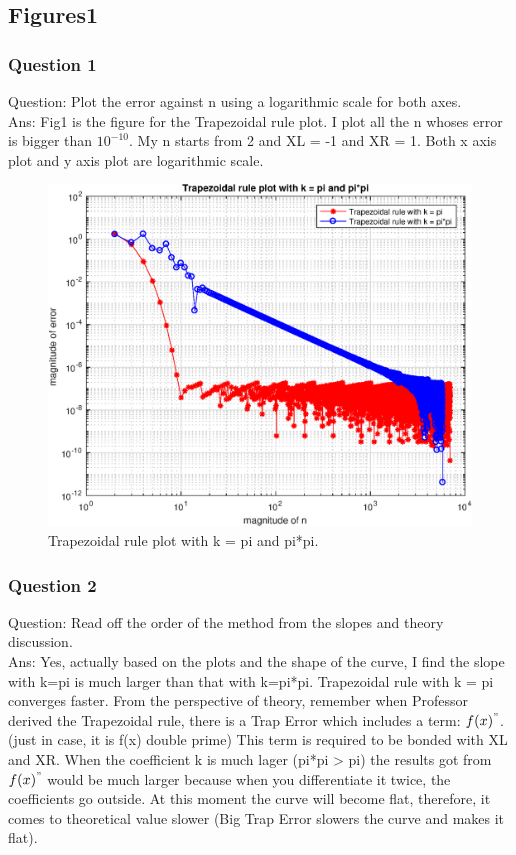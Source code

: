 \documentclass[titlepage]{article}
\begin{document}
\subsection{Figures1}
\subsubsection{Question 1} 
Question: Plot the error against n using a logarithmic scale for both axes.\\
Ans: Fig1 is the figure for the Trapezoidal rule plot. I plot all the n
whoses error is bigger than $10^{-10}$. My n starts from 2 and XL = -1
and XR = 1. Both x axis plot and y axis plot are logarithmic scale.

\begin{figure}[htb]
\begin{center}
\includegraphics[width=1.0\textwidth]{Trapezoidal.eps}
\caption{Trapezoidal rule plot with k = pi and pi*pi. \label{fig:1}}
\end{center}
\end{figure}

\subsubsection{Question 2}
Question: Read off the order of the method from the slopes and theory discussion.\\
Ans: Yes, actually based on the plots and the shape of the curve, I
find the slope with k=pi is much larger than that with
k=pi*pi. Trapezoidal rule with k = pi converges faster. From the
perspective of theory, remember when Professor derived the Trapezoidal
rule, there is a Trap Error which includes a term: $f(x)^"$. (just in
case, it is f(x) double prime) This term
is required to be bonded with XL and XR. When the coefficient k is
much lager (pi*pi > pi) the results got from $f(x)^"$ would be much
larger because when you differentiate it twice, the coefficients go
outside. At this moment the curve will become flat, therefore, it comes to
theoretical value slower (Big Trap Error slowers the curve and makes
it flat).
\end{document}
